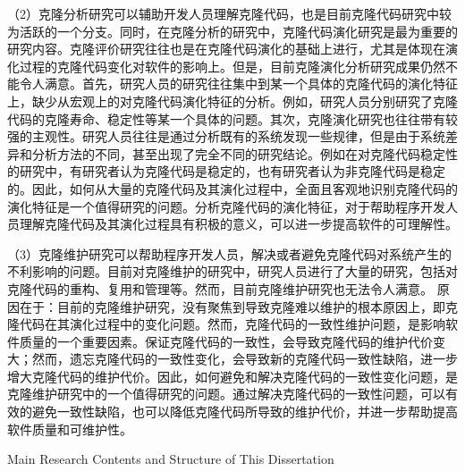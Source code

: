 （2）克隆分析研究可以辅助开发人员理解克隆代码，也是目前克隆代码研究中较为活跃的一个分支。同时，在克隆分析的研究中，克隆代码演化研究是最为重要的研究内容。克隆评价研究往往也是在克隆代码演化的基础上进行，尤其是体现在演化过程的克隆代码变化对软件的影响上。但是，目前克隆演化分析研究成果仍然不能令人满意。首先，研究人员的研究往往集中到某一个具体的克隆代码的演化特征上，缺少从宏观上的对克隆代码演化特征的分析。例如，研究人员分别研究了克隆代码的克隆寿命、稳定性等某一个具体的问题。其次，克隆演化研究也往往带有较强的主观性。研究人员往往是通过分析既有的系统发现一些规律，但是由于系统差异和分析方法的不同，甚至出现了完全不同的研究结论。例如在对克隆代码稳定性的研究中，有研究者认为克隆代码是稳定的，也有研究者认为非克隆代码是稳定的。因此，如何从大量的克隆代码及其演化过程中，全面且客观地识别克隆代码的演化特征是一个值得研究的问题。分析克隆代码的演化特征，对于帮助程序开发人员理解克隆代码及其演化过程具有积极的意义，可以进一步提高软件的可理解性。


（3）克隆维护研究可以帮助程序开发人员，解决或者避免克隆代码对系统产生的不利影响的问题。目前对克隆维护的研究中，研究人员进行了大量的研究，包括对克隆代码的重构、复用和管理等。然而，目前克隆维护研究也无法令人满意。%
原因在于：目前的克隆维护研究，没有聚焦到导致克隆难以维护的根本原因上，即克隆代码在其演化过程中的变化问题。然而，克隆代码的一致性维护问题，是影响软件质量的一个重要因素。保证克隆代码的一致性，会导致克隆代码的维护代价变大；然而，遗忘克隆代码的一致性变化，会导致新的克隆代码一致性缺陷，进一步增大克隆代码的维护代价。因此，如何避免和解决克隆代码的一致性变化问题，是克隆维护研究中的一个值得研究的问题。通过解决克隆代码的一致性问题，可以有效的避免一致性缺陷，也可以降低克隆代码所导致的维护代价，并进一步帮助提高软件质量和可维护性。

{Main Research Contents and Structure of This Dissertation}

